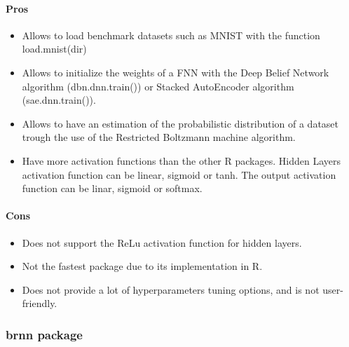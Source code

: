 \documentclass[letter,8pt]{article}\usepackage[]{graphicx}\usepackage[]{color}
\begin{document}
\paragraph{Pros}
\begin{itemize}
\item Allows to load benchmark datasets such as MNIST with the function load.mnist(dir)
\item Allows to initialize the weights of a FNN with the Deep Belief Network algorithm (dbn.dnn.train()) or Stacked AutoEncoder algorithm (sae.dnn.train()).
\item Allows to have an estimation of the probabilistic distribution of a dataset trough the use of the Restricted Boltzmann machine algorithm.
\item Have more activation functions than the other R packages. Hidden Layers activation function can be linear, sigmoid or tanh. The output activation function can be linar, sigmoid or softmax.
\end{itemize}
\paragraph{Cons}
\begin{itemize}
\item Does not support the ReLu activation function for hidden layers.
\item Not the fastest package due to its implementation in R.
\item Does not provide a lot of hyperparameters tuning options, and is not user-friendly.
\end{itemize}

\subsubsection{brnn package}
\end{document}
